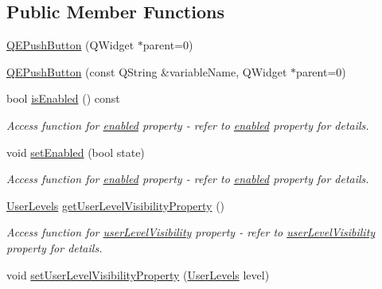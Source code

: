 \subsection*{Public Member Functions}
\begin{DoxyCompactItemize}
\item 
\hyperlink{classQEPushButton_aac8385789a87e049b4723068b2d88585}{QEPushButton} (QWidget $\ast$parent=0)
\item 
\hyperlink{classQEPushButton_ab745a3d31a8ea4718ab865f4cf5edaf8}{QEPushButton} (const QString \&variableName, QWidget $\ast$parent=0)
\item 
\hypertarget{classQEPushButton_a6c8552918ebd572745b3f2f32f6341eb}{
bool \hyperlink{classQEPushButton_a6c8552918ebd572745b3f2f32f6341eb}{isEnabled} () const }
\label{classQEPushButton_a6c8552918ebd572745b3f2f32f6341eb}

\begin{DoxyCompactList}\small\item\em Access function for \hyperlink{classQEPushButton_a223d8878ab3e235c7da509731d489737}{enabled} property -\/ refer to \hyperlink{classQEPushButton_a223d8878ab3e235c7da509731d489737}{enabled} property for details. \end{DoxyCompactList}\item 
\hypertarget{classQEPushButton_afe8acae62d139a107c6b250fe6c9ca41}{
void \hyperlink{classQEPushButton_afe8acae62d139a107c6b250fe6c9ca41}{setEnabled} (bool state)}
\label{classQEPushButton_afe8acae62d139a107c6b250fe6c9ca41}

\begin{DoxyCompactList}\small\item\em Access function for \hyperlink{classQEPushButton_a223d8878ab3e235c7da509731d489737}{enabled} property -\/ refer to \hyperlink{classQEPushButton_a223d8878ab3e235c7da509731d489737}{enabled} property for details. \end{DoxyCompactList}\item 
\hypertarget{classQEPushButton_a6cd075ea0cb3a3be3bf916e3724480e7}{
\hyperlink{classQEPushButton_a1afc62a8bcda84a0c2ec4c5032547620}{UserLevels} \hyperlink{classQEPushButton_a6cd075ea0cb3a3be3bf916e3724480e7}{getUserLevelVisibilityProperty} ()}
\label{classQEPushButton_a6cd075ea0cb3a3be3bf916e3724480e7}

\begin{DoxyCompactList}\small\item\em Access function for \hyperlink{classQEPushButton_ad95a2bf16f07fbb22fb66bb8e61c02d1}{userLevelVisibility} property -\/ refer to \hyperlink{classQEPushButton_ad95a2bf16f07fbb22fb66bb8e61c02d1}{userLevelVisibility} property for details. \end{DoxyCompactList}\item 
\hypertarget{classQEPushButton_a94028bc01734947c4fb0bfa44e8094b0}{
void \hyperlink{classQEPushButton_a94028bc01734947c4fb0bfa44e8094b0}{setUserLevelVisibilityProperty} (\hyperlink{classQEPushButton_a1afc62a8bcda84a0c2ec4c5032547620}{UserLevels} level)}
\label{classQEPushButton_a94028bc01734947c4fb0bfa44e8094b0}


\end{DoxyCompactItemize}
